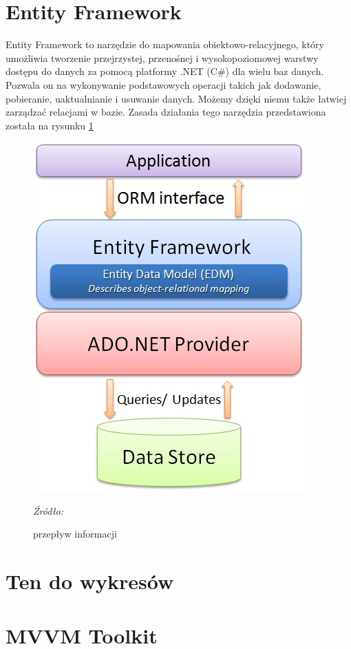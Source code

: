 \documentclass[12pt,twoside]{report}
\begin{document}
\section{Entity Framework}
Entity Framework to narzędzie do mapowania obiektowo-relacyjnego, który umożliwia tworzenie przejrzystej, przenośnej i wysokopoziomowej warstwy dostępu do danych za pomocą platformy .NET (C\#) dla wielu baz danych.  Pozwala on na wykonywanie podstawowych operacji takich jak dodawanie, pobieranie, uaktualnianie i usuwanie danych. Możemy dzięki niemu także łatwiej zarządzać relacjami w bazie. Zasada działania tego narzędzia przedstawiona została na rysunku \ref{EntityArchitecture}
\begin{figure}[H]
	\centering
	\includegraphics[scale=0.5]{EntityArchitecture}
	\caption{przepływ informacji}
	\textit{Źródło: \cite{Entity}}
	\label{EntityArchitecture}
\end{figure}
\section{Ten do wykresów}

\section{MVVM Toolkit}
\end{document}
